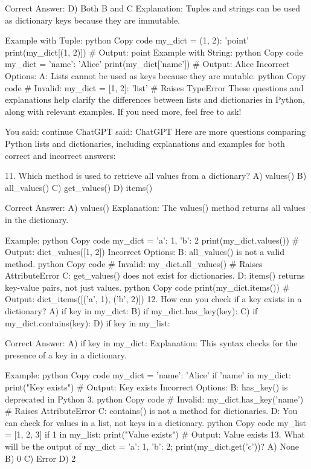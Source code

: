 Correct Answer: D) Both B and C
Explanation: Tuples and strings can be used as dictionary keys because they are immutable.

Example with Tuple:
python
Copy code
my_dict = {(1, 2): 'point'}
print(my_dict[(1, 2)])  # Output: point
Example with String:
python
Copy code
my_dict = {'name': 'Alice'}
print(my_dict['name'])  # Output: Alice
Incorrect Options:
A: Lists cannot be used as keys because they are mutable.
python
Copy code
# Invalid: my_dict = {[1, 2]: 'list'}  # Raises TypeError
These questions and explanations help clarify the differences between lists and dictionaries in Python, along with relevant examples. If you need more, feel free to ask!






You said:
continue
ChatGPT said:
ChatGPT
Here are more questions comparing Python lists and dictionaries, including explanations and examples for both correct and incorrect answers:

11. Which method is used to retrieve all values from a dictionary?
A) values()
B) all_values()
C) get_values()
D) items()

Correct Answer: A) values()
Explanation: The values() method returns all values in the dictionary.

Example:
python
Copy code
my_dict = {'a': 1, 'b': 2}
print(my_dict.values())  # Output: dict_values([1, 2])
Incorrect Options:
B: all_values() is not a valid method.
python
Copy code
# Invalid: my_dict.all_values()  # Raises AttributeError
C: get_values() does not exist for dictionaries.
D: items() returns key-value pairs, not just values.
python
Copy code
print(my_dict.items())  # Output: dict_items([('a', 1), ('b', 2)])
12. How can you check if a key exists in a dictionary?
A) if key in my_dict:
B) if my_dict.has_key(key):
C) if my_dict.contains(key):
D) if key in my_list:

Correct Answer: A) if key in my_dict:
Explanation: This syntax checks for the presence of a key in a dictionary.

Example:
python
Copy code
my_dict = {'name': 'Alice'}
if 'name' in my_dict:
    print("Key exists")  # Output: Key exists
Incorrect Options:
B: has_key() is deprecated in Python 3.
python
Copy code
# Invalid: my_dict.has_key('name')  # Raises AttributeError
C: contains() is not a method for dictionaries.
D: You can check for values in a list, not keys in a dictionary.
python
Copy code
my_list = [1, 2, 3]
if 1 in my_list:
    print("Value exists")  # Output: Value exists
13. What will be the output of my_dict = {'a': 1, 'b': 2}; print(my_dict.get('c'))?
A) None
B) 0
C) Error
D) 2

